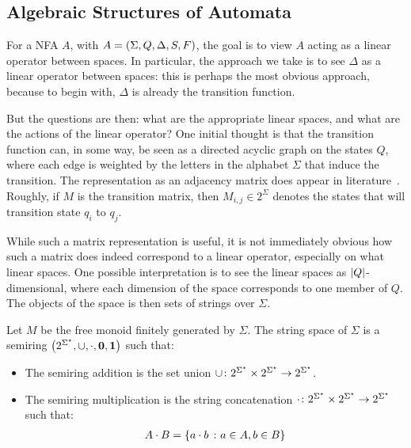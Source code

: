 \documentclass[12pt]{article}
\begin{document}
\subsection{Algebraic Structures of Automata}

For a NFA \(A\), with \(A = \left(\Sigma, Q, \Delta, S, F\right)\),
the goal is to view \(A\) acting as a linear operator between spaces.
In particular, the approach we take is to see \(\Delta\) as a
linear operator between spaces: this is perhaps the most obvious approach,
because to begin with, \(\Delta\) is already the transition function.

But the questions are then:
what are the appropriate linear spaces,
and what are the actions of the linear operator?
One initial thought is that the transition function can, in some way,
be seen as a directed acyclic graph on the states \(Q\),
where each edge is weighted by the letters in the alphabet \(\Sigma\)
that induce the transition.
The representation as an adjacency matrix does appear in
literature~\cite{savage1998models}.
Roughly, if \(M\) is the transition matrix, then \(M_{i, j} \in 2^{\Sigma}\)
denotes the states that will transition state \(q_i\) to \(q_j\).

While such a matrix representation is useful,
it is not immediately obvious how such a matrix does indeed correspond
to a linear operator, especially on what linear spaces.
One possible interpretation is to see
the linear spaces as \(\left\lvert Q\right\rvert\)-dimensional,
where each dimension of the space corresponds to one member of \(Q\).
The objects of the space is then sets of strings over \(\Sigma\).

\begin{definition}
  Let \(M\) be the free monoid finitely generated by \(\Sigma\).
  The string space of \(\Sigma\) is a semiring
  \(\left(2^{\Sigma^\star}, \cup, \cdot, \mathbf{0}, \mathbf{1}\right)\)
  such that:
  \begin{itemize}
    \item
      The semiring addition is the set union
      \(\cup \colon 2^{\Sigma^\star} \times
        2^{\Sigma^\star} \to 2^{\Sigma^\star}\).

    \item
      The semiring multiplication is the string concatenation
      \(\cdot \colon 2^{\Sigma^\star} \times
        2^{\Sigma^\star} \to 2^{\Sigma^\star}\)
      such that:
      \begin{align*}
        A \cdot B
          = \left\{a \cdot b \ \colon a \in A, b \in B\right\}
      \end{align*}
  \end{itemize}
\end{definition}
\end{document}
